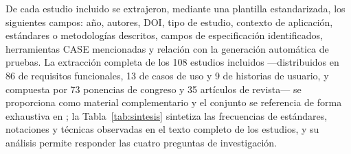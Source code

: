 \documentclass[10pt,journal,twoside,letterpaper]{IEEEtran}
\begin{document}
	De cada estudio incluido se extrajeron, mediante una plantilla estandarizada, los siguientes campos: año, autores, DOI, tipo de estudio, contexto de aplicación, estándares o metodologías descritos, campos de especificación identificados, herramientas CASE mencionadas y relación con la generación automática de pruebas. La extracción completa de los 108 estudios incluidos ---distribuidos en 86 de requisitos funcionales, 13 de casos de uso y 9 de historias de usuario, y compuesta por 73 ponencias de congreso y 35 artículos de revista--- se proporciona como material complementario y el conjunto se referencia de forma exhaustiva en \cite{p001,p002,p003,p004,p005,p006,p007,p008,p009,p010,p011,p012,p013,p014,p015,p016,p017,p018,p019,p020,p021,p022,p023,p024,p025,p026,p027,p028,p029,p030,p031,p032,p033,p034,p035,p036,p037,p038,p039,p040,p041,p042,p043,p044,p045,p046,p047,p048,p049,p050,p051,p052,p053,p054,p055,p056,p057,p058,p059,p060,p061,p062,p063,p064,p065,p066,p067,p068,p069,p070,p071,p072,p073,p074,p075,p076,p077,p078,p079,p080,p081,p082,p083,p084,p085,p086,p087,p088,p089,p090,p091,p092,p093,p094,p095,p096,p097,p098,p099,p100,p101,p102,p103,p104,p105,p106,p107,p108}; la Tabla~\ref{tab:sintesis} sintetiza las frecuencias de estándares, notaciones y técnicas observadas en el texto completo de los estudios, y su análisis permite responder las cuatro preguntas de investigación.
	
\end{document}
